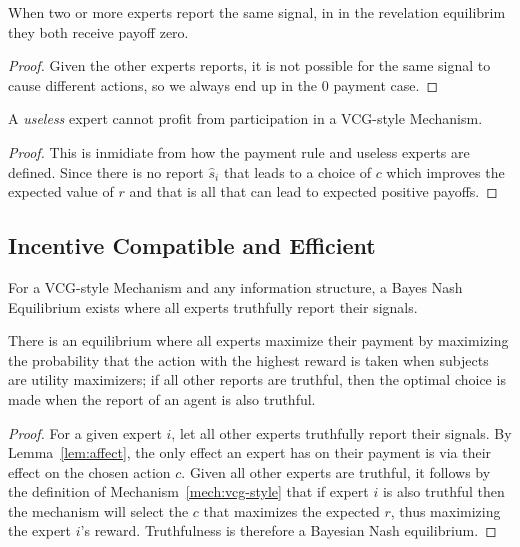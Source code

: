 \begin{lem}
	When two or more experts report the same signal, in in the revelation equilibrim they both receive payoff zero. 
\end{lem}

\begin{proof}
	Given the other experts reports, it is not possible for the same signal to cause different actions, so we always end up in the 0 payment case.
\end{proof}


\begin{lem}
	A \emph{useless} expert cannot profit from participation in a VCG-style Mechanism.
\end{lem}

\begin{proof}
This is inmidiate from how the payment rule and useless experts are defined. Since there is no report $\hat{s}_i$ that leads to a choice of $c$ which improves the expected value of $r$ and that is all that can lead to expected positive payoffs.
\end{proof}


\subsection{Incentive Compatible and Efficient}

\begin{thm}
	For a VCG-style Mechanism and any information structure, a Bayes Nash Equilibrium exists where all experts truthfully report their signals.
\end{thm}

There is an equilibrium where all experts maximize their payment by maximizing the probability that the action with the highest reward is taken when subjects are utility maximizers; if all other reports are truthful, then the optimal choice is made when the report of an agent is also truthful.

\begin{proof}
For a given expert $i$, let all other experts truthfully report their signals. By Lemma~\ref{lem:affect}, the only effect an expert has on their payment is via their effect on the chosen action $c$. Given all other experts are truthful, it follows by the definition of Mechanism~\ref{mech:vcg-style} that if expert $i$ is also truthful then the mechanism will select the $c$ that maximizes the expected $r$, thus maximizing the expert $i$'s reward. Truthfulness is therefore a Bayesian Nash equilibrium.
\end{proof}



